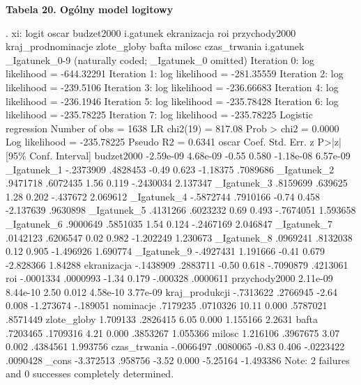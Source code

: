 \textbf{Tabela 20. Ogólny model logitowy}
\begin{stlog}	

. xi: logit oscar  budzet2000 i.gatunek ekranizacja roi przychody2000 kraj_prodnominacje zlote_globy 
bafta milosc czas_trwania
i.gatunek         _Igatunek_0-9       (naturally coded; _Igatunek_0 omitted)
{\smallskip}
Iteration 0:   log likelihood = -644.32291  
Iteration 1:   log likelihood = -281.35559  
Iteration 2:   log likelihood =  -239.5106  
Iteration 3:   log likelihood = -236.66683  
Iteration 4:   log likelihood =  -236.1946  
Iteration 5:   log likelihood = -235.78428  
Iteration 6:   log likelihood = -235.78225  
Iteration 7:   log likelihood = -235.78225  
{\smallskip}
Logistic regression                               Number of obs   =       1638
                                                  LR chi2(19)     =     817.08
                                                  Prob > chi2     =     0.0000
Log likelihood = -235.78225                       Pseudo R2       =     0.6341
{\smallskip}
         oscar {\VBAR}      Coef.   Std. Err.      z    P>|z|     [95\% Conf. Interval]
    budzet2000 {\VBAR}  -2.59e-09   4.68e-09    -0.55   0.580    -1.18e-08    6.57e-09
   _Igatunek_1 {\VBAR}  -.2373909   .4828453    -0.49   0.623     -1.18375    .7089686
   _Igatunek_2 {\VBAR}   .9471718   .6072435     1.56   0.119    -.2430034    2.137347
   _Igatunek_3 {\VBAR}   .8159699    .639625     1.28   0.202     -.437672    2.069612
   _Igatunek_4 {\VBAR}  -.5872744   .7910166    -0.74   0.458    -2.137639    .9630898
   _Igatunek_5 {\VBAR}   .4131266   .6023232     0.69   0.493    -.7674051    1.593658
   _Igatunek_6 {\VBAR}   .9000649   .5851035     1.54   0.124    -.2467169    2.046847
   _Igatunek_7 {\VBAR}   .0142123   .6206547     0.02   0.982    -1.202249    1.230673
   _Igatunek_8 {\VBAR}   .0969241   .8132038     0.12   0.905    -1.496926    1.690774
   _Igatunek_9 {\VBAR}  -.4927431   1.191666    -0.41   0.679    -2.828366     1.84288
   ekranizacja {\VBAR}  -.1438909   .2883711    -0.50   0.618    -.7090879    .4213061
           roi {\VBAR}  -.0001334   .0000993    -1.34   0.179     -.000328    .0000611
 przychody2000 {\VBAR}   2.11e-09   8.44e-10     2.50   0.012     4.58e-10    3.77e-09
kraj_produkcji {\VBAR}  -.7313622   .2766945    -2.64   0.008    -1.273674    -.189051
     nominacje {\VBAR}   .7179235   .0710326    10.11   0.000     .5787021    .8571449
   zlote_globy {\VBAR}   1.709133   .2826415     6.05   0.000     1.155166      2.2631
         bafta {\VBAR}   .7203465   .1709316     4.21   0.000     .3853267    1.055366
        milosc {\VBAR}   1.216106   .3967675     3.07   0.002     .4384561    1.993756
  czas_trwania {\VBAR}  -.0066497   .0080065    -0.83   0.406    -.0223422    .0090428
         _cons {\VBAR}  -3.372513    .958756    -3.52   0.000     -5.25164   -1.493386
Note: 2 failures and 0 successes completely determined.


\end{stlog}

